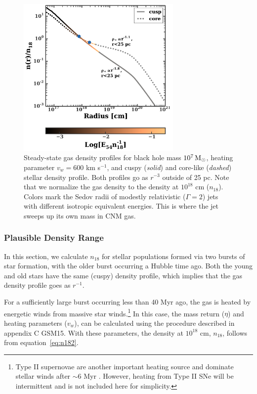 \documentclass[usenatbib,fleqn]{mnras}
\newcommand{\Msun}{{\rm M_\odot}}
\begin{document}
\begin{figure}
\includegraphics[width=8cm]{sedov_radius.pdf}
\caption{\label{fig:profiles} Steady-state gas density profiles for
  black hole mass $10^{7} \,\Msun$, heating parameter $v_w=600$ km
  s$^{-1}$, and cuspy ({\it solid}) and core-like ({\it dashed})
  stellar density profile. Both profiles go as $r^{-3}$ outside of 25
  pc. Note that we normalize the gas density to the density at
  $10^{18}$ cm ($n_{18}$). Colors mark the Sedov radii of modestly
  relativistic ($\Gamma=2$) jets with different isotropic equivalent
  energies. This is where the jet sweeps up its own mass in CNM gas.}
\end{figure}



\subsubsection{Plausible Density Range}
\label{sec:densAllowed}

In this section, we calculate $n_{18}$ for stellar populations
formed via two bursts of star formation, with the older burst
occurring a Hubble time ago.  Both the young and old stars have the
same (cuspy) density profile, which implies that the gas density
profile goes as $r^{-1}$.

For a sufficiently large burst occurring less than 40 Myr ago, the gas
is heated by energetic winds from massive star winds.\footnote{Type II
  supernovae are another important heating source and dominate stellar
  winds after $\sim$6 Myr \citep{Voss+2009}. However, heating from
  Type II SNe will be intermittent and is not included here for
  simplicity.}  In this case, the mass return ($\eta$) and heating
parameters ($v_w$), can be calculated using the procedure described in
appendix C GSM15. With these parameters, the density at $10^{18}$ cm,
$n_{18}$, follows from equation~\eqref{eq:n182}.
\end{document}
